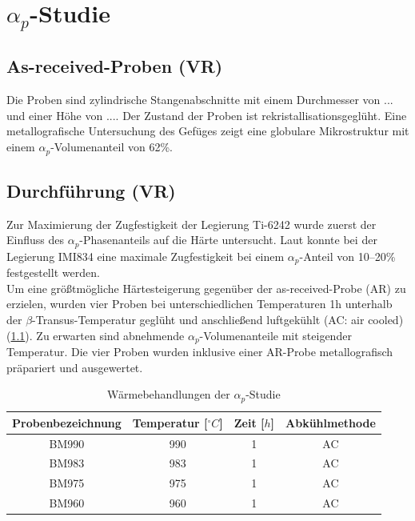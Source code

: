 \chapter{$\alpha_p$-Studie}

\section{As-received-Proben (VR)}

Die Proben sind zylindrische Stangenabschnitte mit einem Durchmesser von {...} und einer Höhe von {...}. Der Zustand der Proben ist rekristallisationsgeglüht. Eine metallografische Untersuchung des Gefüges zeigt eine globulare Mikrostruktur mit einem $\alpha_p$-Volumenanteil von 62\%. 


\section{Durchführung (VR)}

Zur Maximierung der Zugfestigkeit der Legierung Ti-6242 wurde zuerst der Einfluss des $\alpha_p$-Phasenanteils auf die Härte untersucht. Laut \cite{Lutjering.2007} konnte bei der Legierung IMI834 eine maximale Zugfestigkeit bei einem $\alpha_p$-Anteil von 10--20\% festgestellt werden. \\
Um eine größtmögliche Härtesteigerung gegenüber der as-received-Probe (AR) zu erzielen, wurden vier Proben bei unterschiedlichen Temperaturen 1h unterhalb der $\beta$-Transus-Temperatur geglüht und anschließend luftgekühlt (AC: air cooled) (\ref{tab:alphap}). Zu erwarten sind abnehmende $\alpha_p$-Volumenanteile mit steigender Temperatur. Die vier Proben wurden inklusive einer AR-Probe metallografisch präpariert und ausgewertet.



\begin{table}
	\centering
	\begin{tabular}{|c|c|c|c|}
		\hline 
		Probenbezeichnung & Temperatur [$^\circ C$] & Zeit [$h$] & Abkühlmethode \\ 
		\hline 
		BM990 & 990 & 1 & AC\\ 
		\hline 
		BM983 & 983 & 1 & AC\\
		\hline
		BM975 & 975 & 1 & AC\\ 
		\hline
		BM960 & 960 & 1 & AC\\ 
		\hline 
	\end{tabular} 
	\caption{Wärmebehandlungen der $\alpha_p$-Studie}
	\label{tab:alphap}
\end{table}



